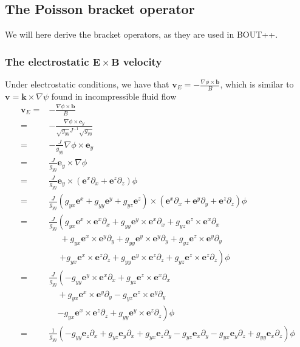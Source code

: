 \documentclass[12pt]{article}
\def\L{\left}
\def\R{\right}
\newcommand{\ve}[1]{\ensuremath{\boldsymbol{#1}}}
\begin{document}
\subsection{The Poisson bracket operator}
%
We will here derive the bracket operators, as they are used in BOUT++.


\subsubsection{The electrostatic \texorpdfstring{$\ve{E}\times \ve{B}$}{ExB}
%
               velocity}
%
Under electrostatic conditions, we have that $\ve{v}_E =
-\frac{\nabla\phi\times\ve{b}}{B}$, which is similar to
$\ve{v}=\ve{k}\times\nabla\psi$ found in incompressible fluid flow
%
\begin{align*}
    \ve{v}_E =& -\frac{\nabla\phi\times\ve{b}}{B}\\
             =&-\frac{\nabla\phi\times\ve{e}_y}{
\sqrt{g_{yy}}J^{-1}\sqrt{g_{yy}}}\\
             =&-\frac{J}{g_{yy}}\nabla\phi\times\ve{e}_y\\
             =&\frac{J}{g_{yy}}\ve{e}_y\times\nabla\phi\\
             =&\frac{J}{g_{yy}}\ve{e}_y\times \L(\ve{e}^x\partial_x +
\ve{e}^z\partial_z\R)\phi\\
             =&\frac{J}{g_{yy}} \L(g_{yx}\ve{e}^x + g_{yy}\ve{e}^y +
g_{yz}\ve{e}^z\R) \times \L(\ve{e}^x\partial_x + \ve{e}^y\partial_y +
\ve{e}^z\partial_z\R)\phi\\
             =&\frac{J}{g_{yy}} \L( g_{yx}\ve{e}^x\times\ve{e}^x\partial_x +
g_{yy}\ve{e}^y\times\ve{e}^x\partial_x + g_{yz}\ve{e}^z\times\ve{e}^x\partial_x
\R.  \\ &\quad\; + g_{yx}\ve{e}^x\times\ve{e}^y\partial_y +
g_{yy}\ve{e}^y\times\ve{e}^y\partial_y + g_{yz}\ve{e}^z\times\ve{e}^y\partial_y
\\ &\quad\; \L.  + g_{yx}\ve{e}^x\times\ve{e}^z\partial_z +
g_{yy}\ve{e}^y\times\ve{e}^z\partial_z + g_{yz}\ve{e}^z\times\ve{e}^z\partial_z
\R) \phi\\
             =&\frac{J}{g_{yy}} \L( - g_{yy}\ve{e}^y\times\ve{e}^x\partial_x +
g_{yz}\ve{e}^z\times\ve{e}^x\partial_x \R.  \\ &\quad +
g_{yx}\ve{e}^x\times\ve{e}^y\partial_y - g_{yz}\ve{e}^z\times\ve{e}^y\partial_y
\\ &\quad \L.  - g_{yx}\ve{e}^x\times\ve{e}^z\partial_z +
g_{yy}\ve{e}^y\times\ve{e}^z\partial_z \R) \phi\\
             =&\frac{1}{g_{yy}} \L( - g_{yy}\ve{e}_z\partial_x +
g_{yz}\ve{e}_y\partial_x + g_{yx}\ve{e}_z\partial_y - g_{yz}\ve{e}_x\partial_y
- g_{yx}\ve{e}_y\partial_z + g_{yy}\ve{e}_x\partial_z \R) \phi
\end{align*}
%
\end{document}
